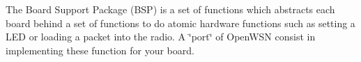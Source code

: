 The Board Support Package (B\+SP) is a set of functions which abstracts each board behind a set of functions to do atomic hardware functions such as setting a L\+ED or loading a packet into the radio. A \char`\"{}port\char`\"{} of Open\+W\+SN consist in implementing these function for your board. 